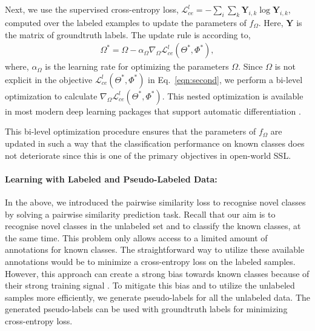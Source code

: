 \documentclass[runningheads]{eccv2022submission}
\begin{document}
Next, we use the supervised cross-entropy loss, $\mathcal{L}_{ce}^l=-\sum_i\sum_k\mathbf{Y}_{i,k}\log\mathbf{\hat{Y}}_{i,k}$, computed over the labeled examples to update the parameters of $f_\Omega$. Here, $\mathbf{Y}$ is the matrix of groundtruth labels. The update rule is according to,
\setlength{\abovedisplayskip}{4pt}
\setlength{\belowdisplayskip}{2pt}
\setlength{\abovedisplayshortskip}{0pt}
\setlength{\belowdisplayshortskip}{0pt}
\begin{align}
\label{eqn:second}
{\Omega}^* = \Omega - \alpha_{\Omega}\nabla_{\Omega}\mathcal{L}_{ce}^l({\Theta}^*, {\Phi}^*), 
\end{align}
where, $\alpha_{\Omega}$ is the learning rate for optimizing the parameters $\Omega$. Since $\Omega$ is not explicit in the objective $\mathcal{L}_{ce}^l({\Theta}^*, {\Phi}^*)$ in Eq.~\ref{eqn:second}, we perform a bi-level optimization to calculate $\nabla_{\Omega}\mathcal{L}_{ce}^l({\Theta}^*, {\Phi}^*)$. This nested optimization is available in most modern deep learning packages that support automatic differentiation \cite{paszke2017automatic,tensorflow2015}.


This bi-level optimization procedure ensures that the parameters of $f_\Omega$ are updated in such a way that the classification performance on known classes does not deteriorate since this is one of the primary objectives in open-world SSL. 

\vspace{-4mm}
\paragraph{\textbf{Learning with Labeled and Pseudo-Labeled Data:}}
In the above, we introduced the pairwise similarity loss to recognise novel classes by solving a pairwise similarity prediction task. Recall that our aim is to recognise novel classes in the unlabeled set and to classify the known classes, at the same time. This problem only allows access to a limited amount of annotations for known classes. The straightforward way to utilize these available annotations would be to minimize a cross-entropy loss on the labeled samples. However, this approach can create a strong bias towards known classes because of their strong training signal \cite{cao2022openworld}. To mitigate this bias and to utilize the unlabeled samples more efficiently, we generate pseudo-labels for all the unlabeled data. The generated pseudo-labels can be used with groundtruth labels for minimizing cross-entropy loss.
\end{document}
